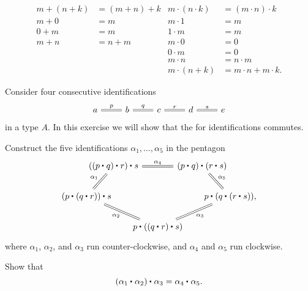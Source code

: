\begin{exercises}
  \begin{align*}
    m+(n+k) & =(m+n)+k & m\cdot (n\cdot k) & = (m\cdot n)\cdot k \\
    m+0 & = m & m\cdot 1 & = m \\
    0+m & = m & 1\cdot m & = m \\
    m+n & = n+m & m\cdot 0 & = 0 \\
    & & 0 \cdot m & = 0 \\
    & & m\cdot n & = n\cdot m\\
    & & m\cdot (n+k) & = m\cdot n + m\cdot k.
  \end{align*}
\item Consider four consecutive identifications
  \begin{equation*}
    \begin{tikzcd}
      a \arrow[r,equals,"p"] & b \arrow[r,equals,"q"] & c \arrow[r,equals,"r"] & d \arrow[r,equals,"s"] & e
    \end{tikzcd}
  \end{equation*}
  in a type $A$. In this exercise we will show that the  for identifications commutes.
  \begin{subexenum}
  \item Construct the five identifications $\alpha_1,\ldots,\alpha_5$ in the pentagon
    \begin{equation*}
      \begin{tikzcd}[column sep=-1.5em]
        &[-2em] \ct{(\ct{(\ct{p}{q})}{r})}{s} \arrow[rr,equals,"\alpha_4"] \arrow[dl,equals,swap,"\alpha_1"] & & \ct{(\ct{p}{q})}{(\ct{r}{s})} \arrow[dr,equals,"\alpha_5"] &[-2em] \\
        \ct{(\ct{p}{(\ct{q}{r})})}{s} \arrow[drr,equals,swap,"\alpha_2"] & & & & \ct{p}{(\ct{q}{(\ct{r}{s})})}, \\
        & & \ct{p}{(\ct{(\ct{q}{r})}{s})} \arrow[urr,equals,swap,"\alpha_3"]
      \end{tikzcd}
    \end{equation*}
    where $\alpha_1$, $\alpha_2$, and $\alpha_3$ run counter-clockwise, and $\alpha_4$ and $\alpha_5$ run clockwise.
  \item Show that
    \begin{equation*}
      \ct{(\ct{\alpha_1}{\alpha_2})}{\alpha_3} = \ct{\alpha_4}{\alpha_5}.
    \end{equation*}
  \end{subexenum}
\end{exercises}

